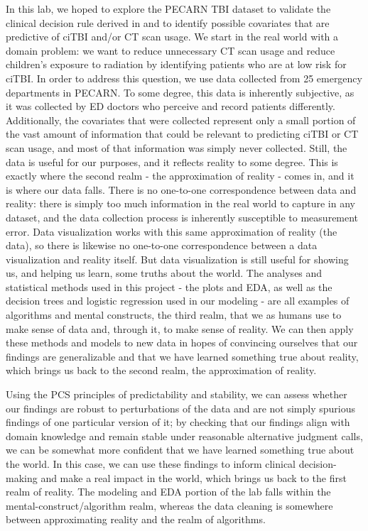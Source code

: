 \documentclass[10pt,letterpaper]{article}
\begin{document}
In this lab, we hoped to explore the PECARN TBI dataset to validate the clinical decision rule derived in \cite{Kuppermann2009} and to identify possible covariates that are predictive of ciTBI and/or CT scan usage.
We start in the real world with a domain problem: we want to reduce unnecessary CT scan usage and reduce children's exposure to radiation by identifying patients who are at low risk for ciTBI. In order to address this question, we use data collected from 25 emergency departments in PECARN.
To some degree, this data is inherently subjective, as it was collected by ED doctors who perceive and record patients differently. Additionally, the covariates that were collected represent only a small portion of the vast amount of information that could be relevant to predicting ciTBI or CT scan usage,
and most of that information was simply never collected. Still, the data is useful for our purposes, and it reflects reality to some degree. This is exactly where the second realm - the approximation of reality - comes in, and it is where our data falls. There is no one-to-one correspondence between data and reality:
there is simply too much information in the real world to capture in any dataset, and the data collection process is inherently susceptible to measurement error. Data visualization works with this same approximation of reality (the data), so there is likewise
no one-to-one correspondence between a data visualization and reality itself. But data visualization is still useful for showing us, and helping us learn, some truths about the world.
The analyses and statistical methods used in this project - the plots and EDA, as well as the decision trees and logistic regression used in our modeling - are all examples of algorithms and mental constructs, the third realm, that we as humans use to make sense of data and, through it, to make sense of reality. We can then apply these
methods and models to new data in hopes of convincing ourselves that our findings are generalizable and that we have learned something true about reality, which brings us back to the second realm, the approximation of reality.

Using the PCS principles of predictability and stability, we can assess whether our findings are robust to
perturbations of the data and are not simply spurious findings of one particular version of it; by checking that our findings align with domain knowledge and remain stable under reasonable alternative judgment calls, we can be somewhat more confident that we have learned something true about the world. In this case, we can
use these findings to inform clinical decision-making and make a real impact in the world, which brings us back to the first realm of reality. The modeling and EDA portion of the lab falls within the mental-construct/algorithm realm, whereas
the data cleaning is somewhere between approximating reality and the realm of algorithms.
\end{document}
